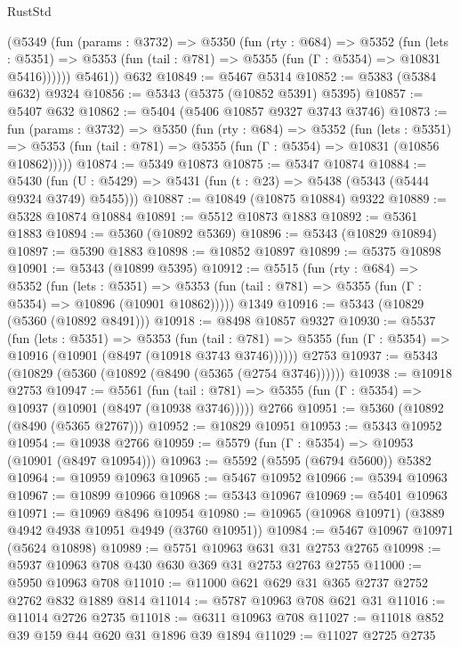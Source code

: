 \begin{lexlean}{RustStd}
\begin{coremodule}
        (@5349
          (fun (params : @3732) =>
          @5350
            (fun (rty : @684) =>
            @5352
              (fun (lets : @5351) =>
              @5353 (fun (tail : @781) => @5355 (fun (Γ : @5354) => @10831 @5416))))))
        @5461))
    @632
@10849 := @5467 @5314
@10852 := @5383 (@5384 @632) @9324
@10856 := @5343 (@5375 (@10852 @5391) @5395)
@10857 := @5407 @632
@10862 := @5404 (@5406 @10857 @9327 @3743 @3746)
@10873 := fun (params : @3732) =>
  @5350
    (fun (rty : @684) =>
    @5352
      (fun (lets : @5351) =>
      @5353 (fun (tail : @781) => @5355 (fun (Γ : @5354) => @10831 (@10856 @10862)))))
@10874 := @5349 @10873
@10875 := @5347 @10874
@10884 := @5430
    (fun (U : @5429) => @5431 (fun (t : @23) => @5438 (@5343 (@5444 @9324 @3749) @5455)))
@10887 := @10849 (@10875 @10884) @9322
@10889 := @5328 @10874 @10884
@10891 := @5512 @10873 @1883
@10892 := @5361 @1883
@10894 := @5360 (@10892 @5369)
@10896 := @5343 (@10829 @10894)
@10897 := @5390 @1883
@10898 := @10852 @10897
@10899 := @5375 @10898
@10901 := @5343 (@10899 @5395)
@10912 := @5515
    (fun (rty : @684) =>
    @5352
      (fun (lets : @5351) =>
      @5353 (fun (tail : @781) => @5355 (fun (Γ : @5354) => @10896 (@10901 @10862)))))
    @1349
@10916 := @5343 (@10829 (@5360 (@10892 @8491)))
@10918 := @8498 @10857 @9327
@10930 := @5537
    (fun (lets : @5351) =>
    @5353
      (fun (tail : @781) =>
      @5355 (fun (Γ : @5354) => @10916 (@10901 (@8497 (@10918 @3743 @3746))))))
    @2753
@10937 := @5343 (@10829 (@5360 (@10892 (@8490 (@5365 (@2754 @3746))))))
@10938 := @10918 @2753
@10947 := @5561
    (fun (tail : @781) => @5355 (fun (Γ : @5354) => @10937 (@10901 (@8497 (@10938 @3746)))))
    @2766
@10951 := @5360 (@10892 (@8490 (@5365 @2767)))
@10952 := @10829 @10951
@10953 := @5343 @10952
@10954 := @10938 @2766
@10959 := @5579 (fun (Γ : @5354) => @10953 (@10901 (@8497 @10954)))
@10963 := @5592 (@5595 (@6794 @5600)) @5382
@10964 := @10959 @10963
@10965 := @5467 @10952
@10966 := @5394 @10963
@10967 := @10899 @10966
@10968 := @5343 @10967
@10969 := @5401 @10963
@10971 := @10969 @8496 @10954
@10980 := @10965 (@10968 @10971) (@3889 @4942 @4938 @10951 @4949 (@3760 @10951))
@10984 := @5467 @10967 @10971 (@5624 @10898)
@10989 := @5751 @10963 @631 @31 @2753 @2765
@10998 := @5937 @10963 @708 @430 @630 @369 @31 @2753 @2763 @2755
@11000 := @5950 @10963 @708
@11010 := @11000 @621 @629 @31 @365 @2737 @2752 @2762 @832 @1889 @814
@11014 := @5787 @10963 @708 @621 @31
@11016 := @11014 @2726 @2735
@11018 := @6311 @10963 @708
@11027 := @11018 @852 @39 @159 @44 @620 @31 @1896 @39 @1894
@11029 := @11027 @2725 @2735

\end{coremodule}
\end{lexlean}
